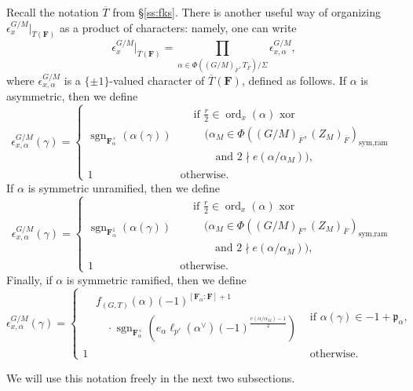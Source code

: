 \documentclass[reqno]{amsart}
\numberwithin{equation}{subsection}
\newcommand{\F}{\mathbf{F}}
\newcommand{\sgn}{\operatorname{sgn}}
\newcommand{\ol}[1]{\overline{#1}}
\newcommand\frp{\mathfrak{p}}
\DeclareMathOperator{\ord}{ord}
\theoremstyle{remark}
\numberwithin{equation}{subsection}
\numberwithin{figure}{subsection}
\begin{document}
Recall the notation $\ol T$ from \S\ref{ss:fks}.
There is another useful way of organizing $\epsilon_x^{G/M}|_{\ol T(\F)}$ as a product of characters: namely, one can write
\[
\epsilon_x^{G/M}|_{\ol T(\F)}
= \prod_{\alpha \in
\Phi((G/M)_{\ol F},T_{\ol F})/\Sigma}
\epsilon_{x,\alpha}^{G/M},
\]
where $\epsilon_{x,\alpha}^{G/M}$ is a $\{\pm1\}$-valued character of $\ol T(\F)$, defined as follows. If $\alpha$ is asymmetric, then we define
\[
\epsilon_{x,\alpha}^{G/M}(\gamma) = \begin{cases}
\sgn_{\F_\alpha^\times}(\alpha(\gamma))
&\begin{aligned}
    &\text{if } \frac{r}{2} \in \ord_x(\alpha) \text{ xor}\\[-2pt]
    &\quad\bigl(\alpha_M \in
    \Phi((G/M)_{\ol F}, (Z_M)_{\ol F})_{\textrm{sym,ram}}\\[-2pt]
    &\qquad\text{and } 2\nmid e(\alpha/\alpha_M)\bigr),
\end{aligned}\\[6pt]
1 &\text{otherwise.}
\end{cases}
\]
If $\alpha$ is symmetric unramified, then we define
\[
\epsilon_{x,\alpha}^{G/M}(\gamma) = \begin{cases}
\sgn_{\F_\alpha^1}(\alpha(\gamma))
&\begin{aligned}
    &\text{if } \frac{r}{2} \in \ord_x(\alpha) \text{ xor}\\[-2pt]
    &\quad\bigl(\alpha_M \in
    \Phi((G/M)_{\ol F}, (Z_M)_{\ol F})_{\textrm{sym,ram}}\\[-2pt]
    &\qquad\text{and } 2\nmid e(\alpha/\alpha_M)\bigr),
\end{aligned}\\[6pt]
1 &\text{otherwise.}
\end{cases}
\]
Finally, if $\alpha$ is symmetric ramified, then we define
\[
\epsilon_{x,\alpha}^{G/M}(\gamma) = \begin{cases}
\begin{aligned}
    &f_{(G,T)}(\alpha)(-1)^{[\F_\alpha\colon \F]+1}\\[-2pt]
    &\quad{}\cdot \sgn_{\F_\alpha^\times}\!\left(
    e_\alpha \ell_{p'}(\alpha^\vee)
    (-1)^{\frac{e(\alpha/\alpha_M)-1}{2}}
    \right)
\end{aligned}
&\text{if } \alpha(\gamma) \in -1 + \frp_\alpha, \\[6pt]
1 &\text{otherwise.}
\end{cases}
\]

We will use this notation freely in the next two subsections.
\end{document}
